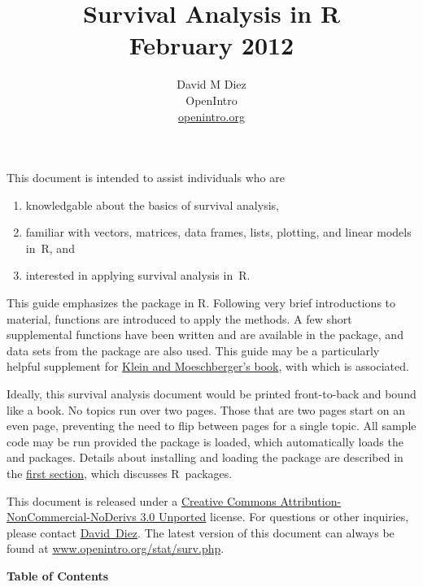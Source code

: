 \documentclass[11pt]{article}
\title{Survival Analysis in R \vspace{1mm} \\ \small{February 2012}\vspace{-3mm}}
\author{%
David M Diez \\ OpenIntro \\ \href{http://www.openintro.org}{openintro.org}} %
\date{}
\newcommand{\R}[1]{\textsf{R}}
\begin{document}
\maketitle \vspace{-3mm}

This document is intended to assist individuals who are
\begin{enumerate}
\setlength{\itemsep}{-1mm}
\item knowledgable about the basics of survival analysis,
\item familiar with vectors, matrices, data frames, lists, plotting, and linear models in~\R{}, and
\item interested in applying survival analysis in~\R{}.
\end{enumerate}

This guide emphasizes the  package in \R{}. Following very brief introductions to material, functions are introduced to apply the methods. A few short supplemental functions have been written and are available in the  package, and data sets from the  package are also used. This guide may be a particularly helpful supplement for \href{http://www.amazon.com/dp/1441929851}{Klein and Moeschberger's book}, with which  is associated.

Ideally, this survival analysis document would be printed front-to-back and bound like a book. No topics run over two pages. Those that are two pages start on an even page, preventing the need to flip between pages for a single topic. All sample code may be run provided the  package is loaded, which automatically loads the  and  packages. Details about installing and loading the  package are described in the \hyperref[packagesAndData]{first section}, which discusses \R{}~packages.

This document is released under a \href{http://creativecommons.org/licenses/by-nc-nd/3.0/}{Creative Commons Attribution-NonCommercial-NoDerivs 3.0 Unported} license. For questions or other inquiries, please contact \href{http://openintro.org/about.php}{David~Diez}. The latest version of this document can always be found at \href{http://www.openintro.org/stat/surv.php}{www.openintro.org/stat/surv.php}.

\vspace{5mm}

\textbf{\large Table of Contents}
\end{document}
